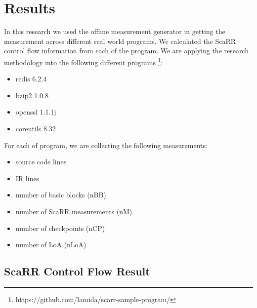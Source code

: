 
\chapter{Results} %

\label{Chapter5} %

In this research we used the offline measurement generator in getting the 
measurement across different real world programs. We calculated the ScaRR 
control flow information from each of the program. We are applying the research 
methodology into the following different programs 
\footnote{https://github.com/lamida/scarr-sample-program/}:

\begin{itemize}
    \item redis 6.2.4
    \item bzip2 1.0.8
    \item openssl 1.1.1j
    \item coreutils 8.32
\end{itemize}

For each of program, we are collecting the following measurements:

\begin{itemize}
    \item source code lines
    \item IR lines
    \item number of basic blocks (nBB)
    \item number of ScaRR measurements (nM)
    \item number of checkpoints (nCP)
    \item number of LoA (nLoA)
\end{itemize}

\section{ScaRR Control Flow Result}



